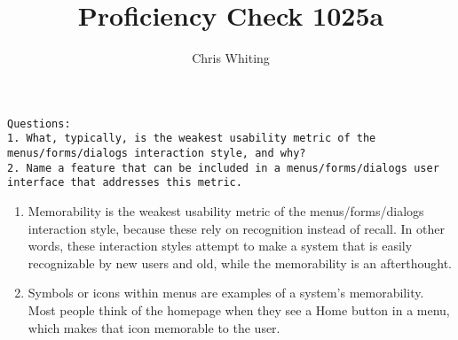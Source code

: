 \documentclass[11pt]{article}
\title{ Proficiency Check 1025a}
\author{Chris Whiting}
\begin{document}
\maketitle

 
\begin{verbatim}
Questions:
1. What, typically, is the weakest usability metric of the menus/forms/dialogs interaction style, and why?
2. Name a feature that can be included in a menus/forms/dialogs user interface that addresses this metric.
\end{verbatim}

\begin{enumerate}
\item 
Memorability is the weakest usability metric of the menus/forms/dialogs interaction style, because these rely on recognition instead of recall. In other words, these interaction styles attempt to make a system that is easily recognizable by new users and old, while the memorability is an afterthought.

\item 
Symbols or icons within menus are examples of a system's memorability. Most people think of the homepage when they see a Home button in a menu, which makes that icon memorable to the user. 
\end{enumerate}
\end{document}
